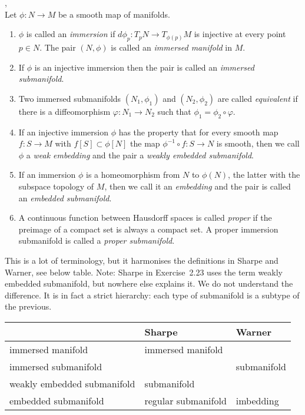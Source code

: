 \begin{definition}\textup{\cite[Def~1.27, Rem~1.33]{Warner1983},\cite[Defs~1.1.36,~1.1.40,~1.2.10]{Sharpe1997}} \\
Let $\phi : N \to M$ be a smooth map of manifolds.
\begin{enumerate}
\item 
$\phi$ is called an \emph{immersion} if $d\phi_p : T_pN \to T_{\phi(p)}M$ is injective at every point $p \in N$.
The pair $(N,\phi)$ is called an \emph{immersed manifold} in $M$.
\item
If $\phi$ is an injective immersion then the pair is called an \emph{immersed submanifold}.
\item 
Two immersed submanifolds $(N_1,\phi_1)$ and $(N_2,\phi_2)$ are called \emph{equivalent} if there is a diffeomorphism $\varphi : N_1 \to N_2$ such that $\phi_1 = \phi_2 \circ \varphi$.
\item
If an injective immersion $\phi$ has the property that for every smooth map $f: S \to M$ with $f[S] \subset \phi[N]$ the map $\phi^{-1} \circ f : S \to N$ is smooth, then we call $\phi$ a \emph{weak embedding} and the pair a \emph{weakly embedded submanifold}.
\item
If an immersion $\phi$ is a homeomorphism from $N$ to $\phi(N)$, the latter with the subspace topology of $M$, then we call it an \emph{embedding} and the pair is called an \emph{embedded submanifold}.
\item
A continuous function between Hausdorff spaces is called \emph{proper} if the preimage of a compact set is always a compact set.
A proper immersion submanifold is called a \emph{proper submanifold}.
\end{enumerate}
\end{definition}

This is a lot of terminology, but it harmonises the definitions in Sharpe and Warner, see below table.
Note: Sharpe in Exercise~2.23 uses the term weakly embedded submanifold, but nowhere else explains it.
We do not understand the difference.
It is in fact a strict hierarchy: each type of submanifold is a subtype of the previous.

\begin{table}[h]
\begin{tabular}{l|l|l}
 & Sharpe & Warner \\ \hline
immersed manifold & immersed manifold & \\
immersed submanifold & & submanifold \\
weakly embedded submanifold & submanifold &  \\
embedded submanifold & regular submanifold & imbedding \\
\end{tabular}
\end{table}

